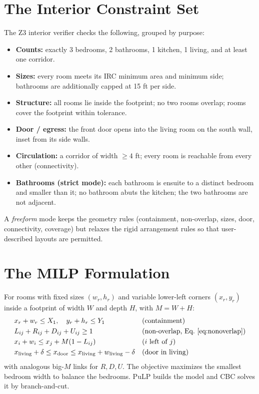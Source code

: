 \documentclass{book}
\begin{document}
\begin{appendices}

\chapter{The Interior Constraint Set}
\label{app:constraints}
The Z3 interior verifier checks the following, grouped by purpose:
\begin{itemize}
\item \textbf{Counts:} exactly 3 bedrooms, 2 bathrooms, 1 kitchen, 1 living, and at least one corridor.
\item \textbf{Sizes:} every room meets its IRC minimum area and minimum side; bathrooms are additionally capped at 15 ft per side.
\item \textbf{Structure:} all rooms lie inside the footprint; no two rooms overlap; rooms cover the footprint within tolerance.
\item \textbf{Door / egress:} the front door opens into the living room on the south wall, inset from its side walls.
\item \textbf{Circulation:} a corridor of width $\ge 4$ ft; every room is reachable from every other (connectivity).
\item \textbf{Bathrooms (strict mode):} each bathroom is ensuite to a distinct bedroom and smaller than it; no bathroom abuts the kitchen; the two bathrooms are not adjacent.
\end{itemize}
A \emph{freeform} mode keeps the geometry rules (containment, non-overlap, sizes, door, connectivity, coverage) but relaxes the rigid arrangement rules so that user-described layouts are permitted.

\chapter{The MILP Formulation}
\label{app:milp}
For rooms with fixed sizes $(w_r,h_r)$ and variable lower-left corners $(x_r,y_r)$ inside a footprint of width $W$ and depth $H$, with $M=W+H$:
\begin{align}
& x_r + w_r \le X_1, \quad y_r + h_r \le Y_1 && \text{(containment)} \\
& L_{ij}+R_{ij}+D_{ij}+U_{ij} \ge 1 && \text{(non-overlap, Eq.~\ref{eq:nonoverlap})} \\
& x_i + w_i \le x_j + M(1-L_{ij}) && \text{($i$ left of $j$)} \\
& x_{\mathrm{living}} + \delta \le x_{\mathrm{door}} \le x_{\mathrm{living}} + w_{\mathrm{living}} - \delta && \text{(door in living)}
\end{align}
with analogous big-$M$ links for $R,D,U$. The objective maximizes the smallest bedroom width to balance the bedrooms. PuLP builds the model and CBC solves it by branch-and-cut.


\end{appendices}
\end{document}
